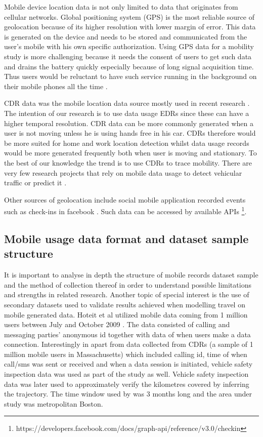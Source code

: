 \documentclass[12pt, a4paper]{report}
\theoremstyle{definition}
\theoremstyle{definition}%
\theoremstyle{definition}%
\theoremstyle{definition}%
\theoremstyle{definition}%
\theoremstyle{definition}%
\begin{document}
Mobile device location data is not only limited to data that originates from cellular networks. Global positioning system (GPS) is the most reliable source of geolocation because of its higher resolution with lower margin of error. This data is generated on the device and needs to be stored and communicated from the user's mobile with his own specific authorization. Using GPS data for a mobility study is more challenging because it needs the consent of users to get such data and drains the battery quickly especially because of long signal acquisition time\cite{Wang2012}. Thus users would be reluctant to have such service running in the background on their mobile phones all the time \cite{Ahas2011}. 

CDR data was the mobile location data source mostly used in recent research \cite{Hoteit2016}. The intention of our research is to use data usage EDRs since these can have a higher temporal resolution. CDR data can be more commonly generated when a user is not moving unless he is using hands free in his car. CDRs therefore would be more suited for home and work location detection whilst data usage records would be more generated frequently both when user is moving and stationary. To the best of our knowledge the trend is to use CDRs to trace mobility. There are very few research projects that rely on mobile data usage to detect vehicular traffic or predict it \cite{Hoteit2014,Calabrese2011}. 

Other sources of geolocation include social mobile application recorded events such as check-ins in facebook \cite{Hoteit2014}. Such data can be accessed by available APIs \footnote{https://developers.facebook.com/docs/graph-api/reference/v3.0/checkin}.

\subsection{Mobile usage data format and dataset sample structure} \label{methodoloy_sources}


It is important to analyse in depth the structure of mobile records dataset sample and the method of collection thereof in order to understand possible limitations and strengths in related research. Another topic of special interest is the use of secondary datasets used to validate results achieved when modelling travel on mobile generated data. Hoteit et al utilized mobile data coming from 1 million users between July and October 2009 \cite{Hoteit2014}. The data consisted of calling and messaging parties' anonymous id together with data of when users make a data connection. Interestingly in \cite{Calabrese2013} apart from data collected from CDRs (a sample of 1 million mobile users in Massachusetts) which included calling id, time of when call/sms was sent or received and when a data session is initiated, vehicle safety inspection data was used as part of the study as well. Vehicle safety inspection data was later used to approximately verify the kilometres covered by inferring the trajectory. The time window used by \cite{Calabrese2013} was 3 months long and the  area under study was metropolitan Boston.
\end{document}
